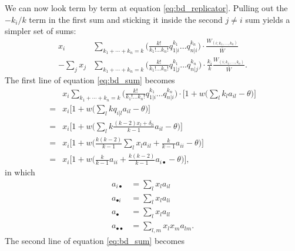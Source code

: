 \documentclass[14pt, a4paper, justified]{article}
\begin{document}
We can now look term by term at equation \ref{eq:bd_replicator}.
Pulling out the $-k_i / k$ term in the first sum and sticking it inside the second $j \neq i$ sum yields a simpler set of sums:
\begin{equation}
    \begin{split}
        x_i & \sum_{k_1 + \cdots + k_n = k} \Big( \frac{k!}{k_1! \ldots k_n!} q_{1|i}^{k_1} \ldots q_{n|i}^{k_n} \Big) \cdot \frac{W_{(i; k_1, \ldots ,k_n)}}{\bar{W}}
        \\
        - \sum_j x_j & \sum_{k_1 + \cdots + k_n = k} \Big( \frac{k!}{k_1! \ldots k_n!} q_{1|j}^{k_1} \ldots q_{n|j}^{k_n} \Big) \cdot \frac{k_i}{k} \frac{W_{(i; k_1, \ldots ,k_n)}}{\bar{W}}.
    \end{split}
    \label{eq:bd_sum}
\end{equation}
The first line of equation \ref{eq:bd_sum} becomes
\begin{equation}
    \begin{split}
        & x_i \sum_{k_1 + \cdots + k_n = k} \Big( \frac{k!}{k_1! \ldots k_n!} q_{1|i}^{k_1} \ldots q_{n|i}^{k_n} \Big) \cdot \Big[ 1 + w \Big( \sum_l k_l a_{il} - \theta \Big) \Big]
        \\
        = & x_i \Big[ 1 + w \Big( \sum_l kq_{i|l} a_{il} - \theta \Big) \Big]
        \\
        = & x_i \Big[ 1 + w \Big( \sum_l k \frac{(k-2)x_l + \delta_{li}}{k-1} a_{il} - \theta \Big) \Big]
        \\
        = & x_i \Big[ 1 + w \Big( \frac{k(k-2)}{k-1} \sum_l x_l a_{il} + \frac{k}{k-1} a_{ii} - \theta \Big) \Big]
        \\
        = & x_i \Big[ 1 + w \Big( \frac{k}{k-1} a_{ii} + \frac{k(k-2)}{k-1} a_{i \bullet } - \theta \Big) \Big],
    \end{split}
    \label{eq:bd_sum_1}
\end{equation}
in which
\begin{equation}
    \begin{split}
        a_{i \bullet} & = \sum_l x_l a_{il}
        \\
        a_{\bullet i} & = \sum_l x_l a_{li}
        \\
        a_{\bullet} & = \sum_l x_l a_{ll}
        \\
        a_{\bullet \bullet} & = \sum_{l,m} x_l x_m a_{lm}.
    \end{split}
\end{equation}
The second line of equation \ref{eq:bd_sum} becomes
\end{document}

